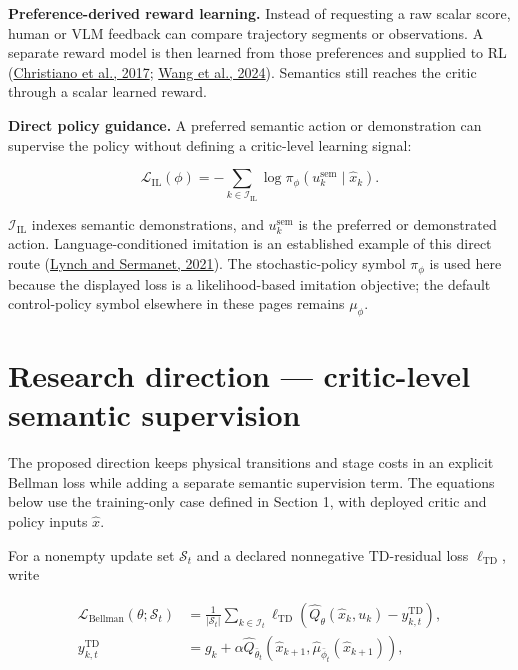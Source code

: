 \documentclass[a4paper]{article}
\begin{document}
\textbf{Preference-derived reward learning.} Instead of requesting a raw scalar
score, human or VLM feedback can compare trajectory segments or observations.
A separate reward model is then learned from those preferences and supplied
to RL (\href{https://papers.nips.cc/paper/7017-deep-reinforcement-learning}{Christiano et al., 2017};
\href{https://proceedings.mlr.press/v235/wang24bn.html}{Wang et al., 2024}).
Semantics still reaches the critic through a scalar learned reward.

\textbf{Direct policy guidance.} A preferred semantic action or demonstration can
supervise the policy without defining a critic-level learning signal:

\begin{equation}
\mathcal L_{\mathrm{IL}}(\phi)
=
-
\sum_{k\in\mathcal I_{\mathrm{IL}}}
\log
\pi_\phi
\!\left(
u_k^{\mathrm{sem}}\mid\widehat x_k
\right).
\end{equation}

$\mathcal I_{\mathrm{IL}}$ indexes semantic demonstrations, and
$u_k^{\mathrm{sem}}$ is the preferred or demonstrated action.
Language-conditioned imitation is an established example of this direct route
(\href{https://www.roboticsproceedings.org/rss17/p047.html}{Lynch and Sermanet, 2021}).
The stochastic-policy symbol $\pi_\phi$ is used here because the displayed
loss is a likelihood-based imitation objective; the default control-policy
symbol elsewhere in these pages remains $\mu_\phi$.

\section{Research direction --- critic-level semantic supervision}

The proposed direction keeps physical transitions and stage costs in an
explicit Bellman loss while adding a separate semantic supervision term. The
equations below use the training-only case defined in Section 1, with deployed
critic and policy inputs $\widehat x$.

For a nonempty update set $\mathcal S_t$ and a declared nonnegative TD-residual
loss $\ell_{\mathrm{TD}}$, write

\begin{equation}
\begin{aligned}
\mathcal L_{\mathrm{Bellman}}
\!\left(
\theta;\mathcal S_t
\right)
&=
\frac{1}{|\mathcal S_t|}
\sum_{k\in\mathcal I_t}
\ell_{\mathrm{TD}}
\!\left(
\widehat Q_\theta(\widehat x_k,u_k)
-
y_{k,t}^{\mathrm{TD}}
\right),\\
y_{k,t}^{\mathrm{TD}}
&=
g_k
+
\alpha
\widehat Q_{\bar\theta_t}
\!\left(
\widehat x_{k+1},
\widehat\mu_{\bar\phi_t}(\widehat x_{k+1})
\right),
\end{aligned}
\end{equation}
\end{document}
